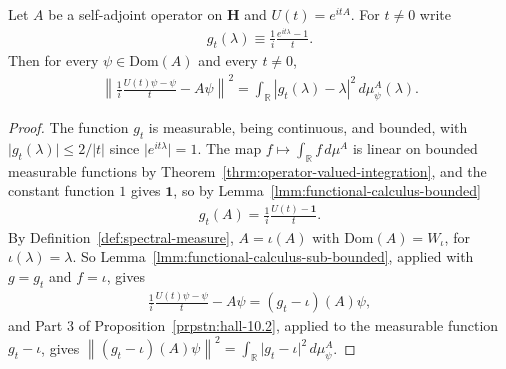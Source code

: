 \begin{lemma}
    \label{lmm:exp-quotient-norm-identity}
    \leanok
    Let $A$ be a self-adjoint operator on $\mathbf{H}$ and $U(t) = e^{itA}$. For $t \ne 0$ write
    \begin{align}
        g_t(\lambda) \equiv \frac{1}{i}\frac{e^{it\lambda} - 1}{t}.
    \end{align}
    Then for every $\psi \in \text{Dom}(A)$ and every $t \ne 0$,
    \begin{align}
        \left\| \frac{1}{i}\frac{U(t)\psi - \psi}{t} - A\psi \right\|^2 = \int_{\mathbb{R}} \left\lvert g_t(\lambda) - \lambda \right\rvert^2 \, d\mu^A_\psi(\lambda).
    \end{align}
\end{lemma}
\begin{proof}
    \leanok
The function $g_t$ is measurable, being continuous, and bounded, with $\lvert g_t(\lambda) \rvert \le 2/\lvert t \rvert$ since $\lvert e^{it\lambda} \rvert = 1$. The map $f \mapsto \int_{\mathbb{R}} f \, d\mu^A$ is linear on bounded measurable functions by Theorem~\ref{thrm:operator-valued-integration}, and the constant function $1$ gives $\mathbf{1}$, so by Lemma~\ref{lmm:functional-calculus-bounded}
\begin{align}
    g_t(A) = \frac{1}{i}\frac{U(t) - \mathbf{1}}{t}.
\end{align}
By Definition~\ref{def:spectral-measure}, $A = \iota(A)$ with $\text{Dom}(A) = W_\iota$, for $\iota(\lambda) = \lambda$. So Lemma~\ref{lmm:functional-calculus-sub-bounded}, applied with $g = g_t$ and $f = \iota$, gives
\begin{align}
    \frac{1}{i}\frac{U(t)\psi - \psi}{t} - A\psi = (g_t - \iota)(A)\psi,
\end{align}
and Part 3 of Proposition~\ref{prpstn:hall-10.2}, applied to the measurable function $g_t - \iota$, gives $\left\| (g_t - \iota)(A)\psi \right\|^2 = \int_{\mathbb{R}} \lvert g_t - \iota \rvert^2 \, d\mu^A_\psi$.
\end{proof}

